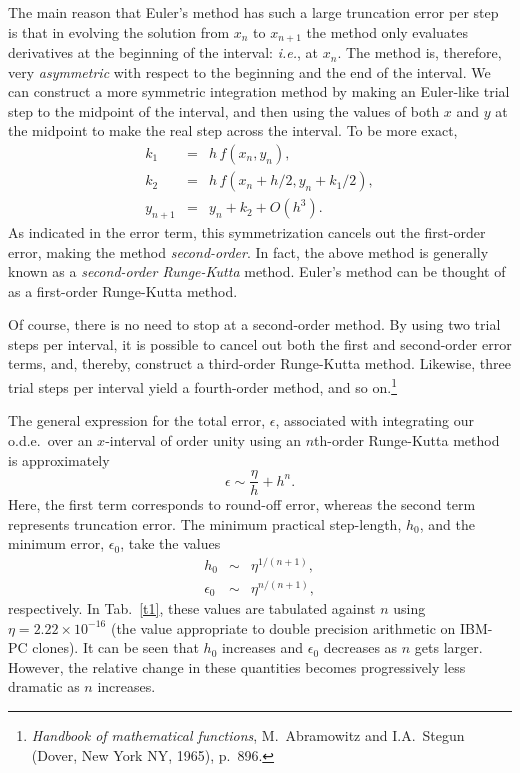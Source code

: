 The main reason that Euler's method has such a large truncation error per step is that in
evolving the solution from $x_n$ to $x_{n+1}$  the method only evaluates
derivatives at the beginning of the
interval: {\em i.e.}, at $x_n$. The method is, therefore, very {\em asymmetric}\/ with
respect to the beginning and the end of the interval. We can construct
a more symmetric integration method by making an Euler-like trial step
to the midpoint of the interval, and then using the values of both $x$ and
$y$ at the midpoint to make the real step across the interval. To be more exact,
\begin{eqnarray}
k_1 &=& h\,f(x_n,y_n),\\[0.5ex]
k_2 &=& h\,f(x_n+h/2, y_n+k_1/2),\\[0.5ex]
y_{n+1}&=& y_n + k_2 + O(h^3).
\end{eqnarray}
As indicated in the error term, this symmetrization cancels out the
first-order error, making the method {\em second-order}. In fact,
the above method is generally known as a {\em second-order Runge-Kutta}\/ method. 
Euler's method can be thought of as a first-order Runge-Kutta method.

Of course, there is no need to stop at a second-order method. By using two
trial steps per interval, it is possible to cancel out both the
first and second-order error terms, and, thereby, construct a third-order
Runge-Kutta method. Likewise, three trial steps per interval yield
a fourth-order method, and so on.\footnote{{\em Handbook of mathematical functions}, M.~Abramowitz and I.A.~Stegun (Dover, New York NY, 1965), p.~896.}

The general expression for the total error, $\epsilon$, associated with
integrating our o.d.e.\ over an $x$-interval of order unity using an
$n$th-order Runge-Kutta method is approximately
\begin{equation}
\epsilon \sim \frac{\eta}{h} + h^n.
\end{equation}
Here, the first term corresponds to round-off error, whereas the second term
represents truncation error. The minimum 
practical step-length, $h_0$, and the minimum error, $\epsilon_0$, take the values
\begin{eqnarray}
h_0 &\sim& \eta^{1/(n+1)},\\[0.5ex]
\epsilon_0 &\sim& \eta^{n/(n+1)},
\end{eqnarray}
respectively.
In Tab.~\ref{t1}, these values are tabulated against $n$ using 
$\eta=2.22 \times 10^{-16}$
(the value appropriate to double precision arithmetic on IBM-PC clones).
It can be seen that  $h_0$ increases and $\epsilon_0$  decreases as $n$ gets larger. However, the relative
change in these quantities
 becomes progressively less dramatic as $n$ increases.
 
